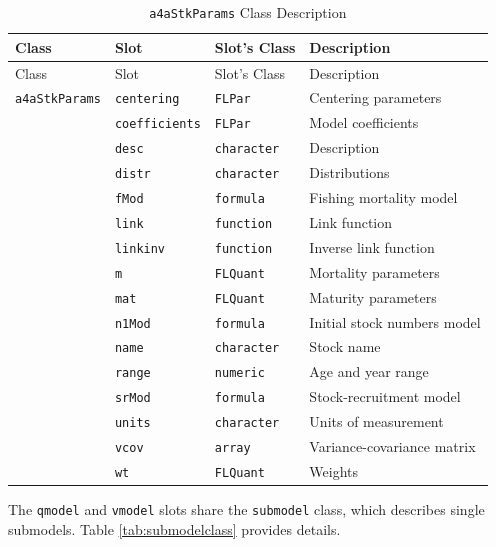 \documentclass[
]{book}
\begin{document}
\begin{longtable}[]{@{}llll@{}}
\caption{\label{tab:a4aStkParamsclass} \texttt{a4aStkParams} Class Description}\tabularnewline
\toprule\noalign{}
Class & Slot & Slot's Class & Description \\
\midrule\noalign{}
\endfirsthead
\toprule\noalign{}
Class & Slot & Slot's Class & Description \\
\midrule\noalign{}
\endhead
\bottomrule\noalign{}
\endlastfoot
\texttt{a4aStkParams} & \texttt{centering} & \texttt{FLPar} & Centering parameters \\
& \texttt{coefficients} & \texttt{FLPar} & Model coefficients \\
& \texttt{desc} & \texttt{character} & Description \\
& \texttt{distr} & \texttt{character} & Distributions \\
& \texttt{fMod} & \texttt{formula} & Fishing mortality model \\
& \texttt{link} & \texttt{function} & Link function \\
& \texttt{linkinv} & \texttt{function} & Inverse link function \\
& \texttt{m} & \texttt{FLQuant} & Mortality parameters \\
& \texttt{mat} & \texttt{FLQuant} & Maturity parameters \\
& \texttt{n1Mod} & \texttt{formula} & Initial stock numbers model \\
& \texttt{name} & \texttt{character} & Stock name \\
& \texttt{range} & \texttt{numeric} & Age and year range \\
& \texttt{srMod} & \texttt{formula} & Stock-recruitment model \\
& \texttt{units} & \texttt{character} & Units of measurement \\
& \texttt{vcov} & \texttt{array} & Variance-covariance matrix \\
& \texttt{wt} & \texttt{FLQuant} & Weights \\
\end{longtable}

The \texttt{qmodel} and \texttt{vmodel} slots share the \texttt{submodel} class, which describes single submodels. Table \ref{tab:submodelclass} provides details.
\end{document}
